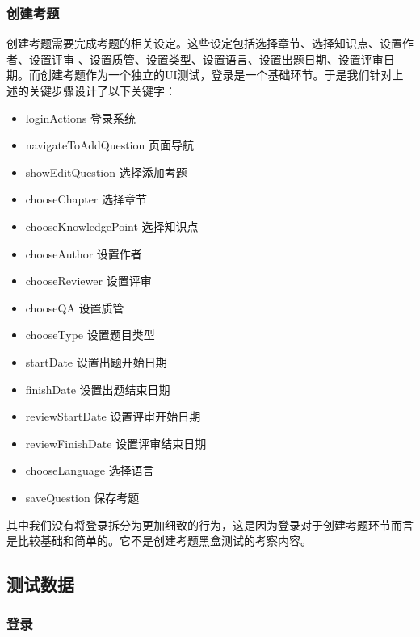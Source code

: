 \documentclass[hyperref, a4paper]{ctexart}
\providecommand{\tightlist}{%
  \setlength{\itemsep}{0pt}\setlength{\parskip}{0pt}}
\begin{document}
\hypertarget{ux521bux5efaux8003ux9898}{%
\subsubsection{创建考题}\label{ux521bux5efaux8003ux9898}}

创建考题需要完成考题的相关设定。这些设定包括选择章节、选择知识点、设置作者、设置评审
、设置质管、设置类型、设置语言、设置出题日期、设置评审日期。而创建考题作为一个独立的UI测试，登录是一个基础环节。于是我们针对上述的关键步骤设计了以下关键字：

\begin{itemize}
\tightlist
\item
  loginActions 登录系统
\item
  navigateToAddQuestion 页面导航
\item
  showEditQuestion 选择添加考题
\item
  chooseChapter 选择章节
\item
  chooseKnowledgePoint 选择知识点
\item
  chooseAuthor 设置作者
\item
  chooseReviewer 设置评审
\item
  chooseQA 设置质管
\item
  chooseType 设置题目类型
\item
  startDate 设置出题开始日期
\item
  finishDate 设置出题结束日期
\item
  reviewStartDate 设置评审开始日期
\item
  reviewFinishDate 设置评审结束日期
\item
  chooseLanguage 选择语言
\item
  saveQuestion 保存考题
\end{itemize}

其中我们没有将登录拆分为更加细致的行为，这是因为登录对于创建考题环节而言是比较基础和简单的。它不是创建考题黑盒测试的考察内容。

\hypertarget{ux6d4bux8bd5ux6570ux636e}{%
\subsection{测试数据}\label{ux6d4bux8bd5ux6570ux636e}}

\hypertarget{ux767bux5f55-1}{%
\subsubsection{登录}\label{ux767bux5f55-1}}
\end{document}
